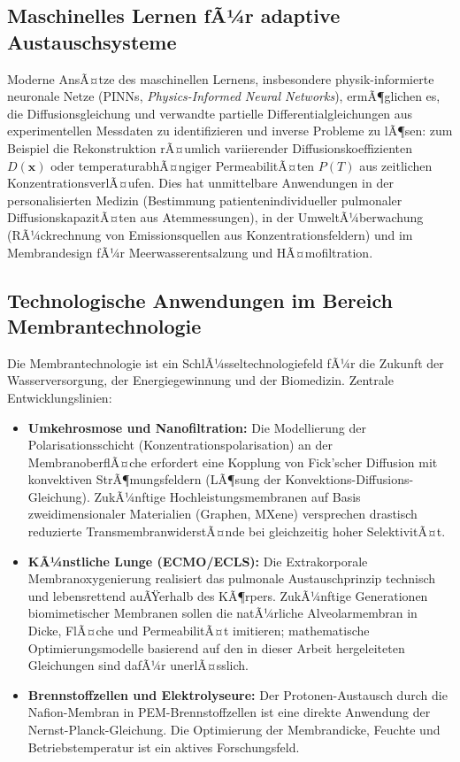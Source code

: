 ﻿\documentclass[a4paper,12pt]{article}
\theoremstyle{definition}
\begin{document}
\subsection{Maschinelles Lernen fÃ¼r adaptive Austauschsysteme}

Moderne AnsÃ¤tze des maschinellen Lernens, insbesondere physik-informierte neuronale
Netze (PINNs, \emph{Physics-Informed Neural Networks}), ermÃ¶glichen es, die
Diffusionsgleichung und verwandte partielle Differentialgleichungen aus experimentellen
Messdaten zu identifizieren und inverse Probleme zu lÃ¶sen: zum Beispiel die
Rekonstruktion rÃ¤umlich variierender Diffusionskoeffizienten $D(\mathbf{x})$ oder
temperaturabhÃ¤ngiger PermeabilitÃ¤ten $P(T)$ aus zeitlichen KonzentrationsverlÃ¤ufen.
Dies hat unmittelbare Anwendungen in der personalisierten Medizin (Bestimmung
patientenindividueller pulmonaler DiffusionskapazitÃ¤ten aus Atemmessungen),
in der UmweltÃ¼berwachung (RÃ¼ckrechnung von Emissionsquellen aus Konzentrationsfeldern)
und im Membrandesign fÃ¼r Meerwasserentsalzung und HÃ¤mofiltration.

\subsection{Technologische Anwendungen im Bereich Membrantechnologie}

Die Membrantechnologie ist ein SchlÃ¼sseltechnologiefeld fÃ¼r die Zukunft der
Wasserversorgung, der Energiegewinnung und der Biomedizin. Zentrale Entwicklungslinien:
\begin{itemize}
    \item \textbf{Umkehrosmose und Nanofiltration:} Die Modellierung der
          Polarisationsschicht (Konzentrationspolarisation) an der MembranoberflÃ¤che
          erfordert eine Kopplung von Fick'scher Diffusion mit konvektiven
          StrÃ¶mungsfeldern (LÃ¶sung der Konvektions-Diffusions-Gleichung). ZukÃ¼nftige
          Hochleistungsmembranen auf Basis zweidimensionaler Materialien (Graphen,
          MXene) versprechen drastisch reduzierte TransmembranwiderstÃ¤nde bei
          gleichzeitig hoher SelektivitÃ¤t.
    \item \textbf{KÃ¼nstliche Lunge (ECMO/ECLS):} Die Extrakorporale
          Membranoxygenierung realisiert das pulmonale Austauschprinzip technisch
          und lebensrettend auÃŸerhalb des KÃ¶rpers. ZukÃ¼nftige Generationen biomimetischer
          Membranen sollen die natÃ¼rliche Alveolarmembran in Dicke, FlÃ¤che und
          PermeabilitÃ¤t imitieren; mathematische Optimierungsmodelle basierend auf
          den in dieser Arbeit hergeleiteten Gleichungen sind dafÃ¼r unerlÃ¤sslich.
    \item \textbf{Brennstoffzellen und Elektrolyseure:} Der Protonen-Austausch durch
          die Nafion-Membran in PEM-Brennstoffzellen ist eine direkte Anwendung
          der Nernst-Planck-Gleichung. Die Optimierung der Membrandicke, Feuchte
          und Betriebstemperatur ist ein aktives Forschungsfeld.
\end{itemize}
\end{document}
